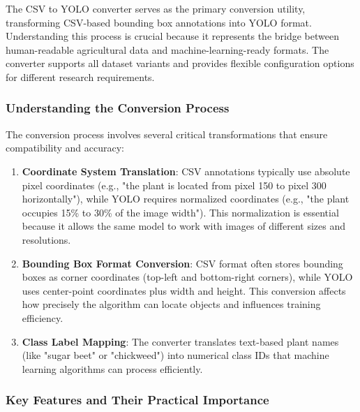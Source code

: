 The CSV to YOLO converter serves as the primary conversion utility, transforming CSV-based bounding box annotations into YOLO format. Understanding this process is crucial because it represents the bridge between human-readable agricultural data and machine-learning-ready formats. The converter supports all dataset variants and provides flexible configuration options for different research requirements.

\subsubsection{Understanding the Conversion Process}

The conversion process involves several critical transformations that ensure compatibility and accuracy:

\begin{enumerate}
    \item \textbf{Coordinate System Translation}: CSV annotations typically use absolute pixel coordinates (e.g., "the plant is located from pixel 150 to pixel 300 horizontally"), while YOLO requires normalized coordinates (e.g., "the plant occupies 15\% to 30\% of the image width"). This normalization is essential because it allows the same model to work with images of different sizes and resolutions.
    
    \item \textbf{Bounding Box Format Conversion}: CSV format often stores bounding boxes as corner coordinates (top-left and bottom-right corners), while YOLO uses center-point coordinates plus width and height. This conversion affects how precisely the algorithm can locate objects and influences training efficiency.
    
    \item \textbf{Class Label Mapping}: The converter translates text-based plant names (like "sugar beet" or "chickweed") into numerical class IDs that machine learning algorithms can process efficiently.
\end{enumerate}

\subsubsection{Key Features and Their Practical Importance}

